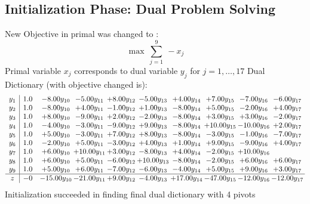 \documentclass[9pt]{article}
\begin{document}
\subsection{Initialization Phase: Dual Problem Solving}
New Objective in primal was changed to : \[ \max\ \sum_{j=1}^{9}\ - x_j \] 
Primal variable $x_j$ corresponds to dual variable $y_j$ for $j = 1,\ldots,17$
Dual Dictionary (with objective changed is): 
\[\begin{array}{c| c c@{\hskip 2pt} c@{\hskip 2pt} c@{\hskip 2pt} c@{\hskip 2pt} c@{\hskip 2pt} c@{\hskip 2pt} c@{\hskip 2pt} c@{\hskip 2pt} }
 y_{1}   &  1.0 & -8.00 y_{10} & -5.00 y_{11} & +  8.00 y_{12} & -5.00 y_{13} & +  4.00 y_{14} & +  7.00 y_{15} & -7.00 y_{16} & -6.00 y_{17}\\
 y_{2}   &  1.0 & -8.00 y_{10} & +  4.00 y_{11} & -1.00 y_{12} & +  1.00 y_{13} & -8.00 y_{14} & +  5.00 y_{15} & -2.00 y_{16} & +  4.00 y_{17}\\
 y_{3}   &  1.0 & +  8.00 y_{10} & -9.00 y_{11} & +  2.00 y_{12} & -2.00 y_{13} & -8.00 y_{14} & +  3.00 y_{15} & +  3.00 y_{16} & -2.00 y_{17}\\
 y_{4}   &  1.0 & -4.00 y_{10} & -3.00 y_{11} & -9.00 y_{12} & +  9.00 y_{13} & -8.00 y_{14} & + 10.00 y_{15} & -10.00 y_{16} & +  2.00 y_{17}\\
 y_{5}   &  1.0 & +  5.00 y_{10} & -3.00 y_{11} & +  7.00 y_{12} & +  8.00 y_{13} & -8.00 y_{14} & -3.00 y_{15} & -1.00 y_{16} & -7.00 y_{17}\\
 y_{6}   &  1.0 & -2.00 y_{10} & +  5.00 y_{11} & -3.00 y_{12} & +  4.00 y_{13} & +  1.00 y_{14} & +  9.00 y_{15} & -9.00 y_{16} & +  4.00 y_{17}\\
 y_{7}   &  1.0 & +  6.00 y_{10} & + 10.00 y_{11} & +  3.00 y_{12} & -8.00 y_{13} & +  4.00 y_{14} & -2.00 y_{15} & + 10.00 y_{16} &   \\
 y_{8}   &  1.0 & +  6.00 y_{10} & +  5.00 y_{11} & -6.00 y_{12} & + 10.00 y_{13} & -8.00 y_{14} & -2.00 y_{15} & +  6.00 y_{16} & +  6.00 y_{17}\\
 y_{9}   &  1.0 & +  5.00 y_{10} & +  6.00 y_{11} & -7.00 y_{12} & -6.00 y_{13} & -4.00 y_{14} & +  5.00 y_{15} & +  9.00 y_{16} & +  3.00 y_{17}\\
\hline
z    &  -0 & -15.00 y_{10} & -21.00 y_{11} & +  9.00 y_{12} & -4.00 y_{13} & + 17.00 y_{14} & -47.00 y_{15} & -12.00 y_{16} & -12.00 y_{17}\\
\end{array}\]
Initialization succeeded in finding final dual dictionary with 4 pivots
\end{document}

